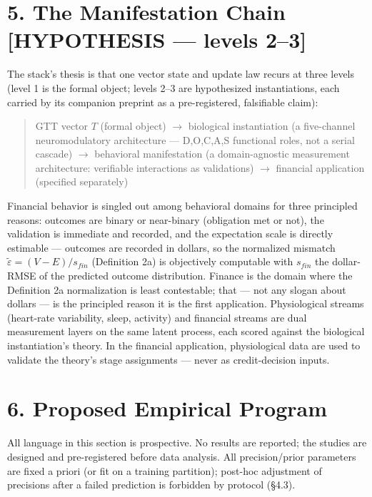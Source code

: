 \documentclass[11pt,twocolumn]{article}
\theoremstyle{gttdef}
\theoremstyle{gttplain}
\begin{document}
\section*{5. The Manifestation Chain [HYPOTHESIS --- levels 2--3]}

The stack's thesis is that one vector state and update law recurs at three levels (level 1 is the formal object; levels 2--3 are hypothesized instantiations, each carried by its companion preprint as a pre-registered, falsifiable claim):

\begin{quote}\noindent GTT vector $T$ (formal object) $\to$ biological instantiation (a five-channel neuromodulatory architecture --- D,O,C,A,S functional roles, not a serial cascade) $\to$ behavioral manifestation (a domain-agnostic measurement architecture: verifiable interactions as validations) $\to$ financial application (specified separately)\end{quote}

Financial behavior is singled out among behavioral domains for three principled reasons: outcomes are binary or near-binary (obligation met or not), the validation is immediate and recorded, and the expectation scale is directly estimable --- outcomes are recorded in dollars, so the normalized mismatch $\tilde{\varepsilon} = (V - E)/s_{fin}$ (Definition 2a) is objectively computable with $s_{fin}$ the dollar-RMSE of the predicted outcome distribution. Finance is the domain where the Definition 2a normalization is least contestable; that --- not any slogan about dollars --- is the principled reason it is the first application. Physiological streams (heart-rate variability, sleep, activity) and financial streams are dual measurement layers on the same latent process, each scored against the biological instantiation's theory. In the financial application, physiological data are used to validate the theory's stage assignments --- never as credit-decision inputs.

\section*{6. Proposed Empirical Program}

All language in this section is prospective. No results are reported; the studies are designed and pre-registered before data analysis. All precision/prior parameters are fixed a priori (or fit on a training partition); post-hoc adjustment of precisions after a failed prediction is forbidden by protocol (\S{}4.3).
\end{document}
